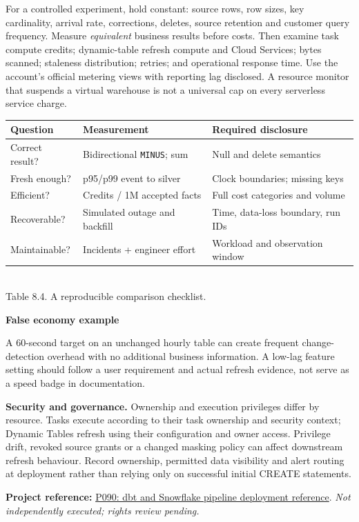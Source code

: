 \documentclass[11pt,twoside]{article}
\newcommand{\repo}[2]{\par\begingroup\fontsize{8.0}{9.6}\selectfont\sffamily\color{inkgray}\textbf{Project reference:} \href{#2}{#1}. \textit{Not independently executed; rights review pending.}\par\endgroup}
\begin{document}
For a controlled experiment, hold constant: source rows, row sizes, key cardinality, arrival rate, corrections, deletes, source retention and customer query frequency. Measure \emph{equivalent} business results before costs. Then examine task compute credits; dynamic-table refresh compute and Cloud Services; bytes scanned; staleness distribution; retries; and operational response time. Use the account's official metering views with reporting lag disclosed. A resource monitor that suspends a virtual warehouse is not a universal cap on every serverless service charge.
\begin{center}\renewcommand{\arraystretch}{1.13}\begin{tabularx}{\linewidth}{@{}p{35mm}p{37mm}X@{}}\toprule
\textbf{Question}&\textbf{Measurement}&\textbf{Required disclosure}\\\midrule
Correct result?&Bidirectional \texttt{MINUS}; sum&Null and delete semantics\\
Fresh enough?&p95/p99 event to silver&Clock boundaries; missing keys\\
Efficient?&Credits / 1M accepted facts&Full cost categories and volume\\
Recoverable?&Simulated outage and backfill&Time, data-loss boundary, run IDs\\
Maintainable?&Incidents + engineer effort&Workload and observation window\\\bottomrule
\end{tabularx}\\{\fontsize{8}{9.5}\selectfont\color{inkgray}Table 8.4. A reproducible comparison checklist.}\end{center}
\begin{whitebox}\textbf{False economy example}\par
A 60-second target on an unchanged hourly table can create frequent change-detection overhead with no additional business information. A low-lag feature setting should follow a user requirement and actual refresh evidence, not serve as a speed badge in documentation.\end{whitebox}
\textbf{Security and governance.} Ownership and execution privileges differ by resource. Tasks execute according to their task ownership and security context; Dynamic Tables refresh using their configuration and owner access. Privilege drift, revoked source grants or a changed masking policy can affect downstream refresh behaviour. Record ownership, permitted data visibility and alert routing at deployment rather than relying only on successful initial CREATE statements.
\repo{P090: dbt and Snowflake pipeline deployment reference}{https://github.com/Snowflake-Labs/sfguide-deploying-pipelines-with-snowflake-and-dbt-labs}
\newpage
\end{document}
